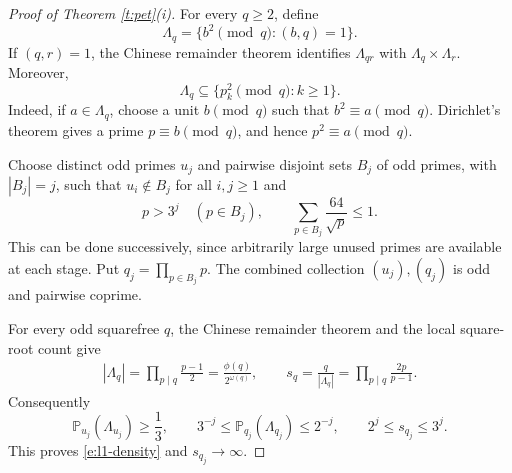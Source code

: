 \documentclass[12pt,reqno]{amsart}
\numberwithin{equation}{section}
\theoremstyle{definition}
\theoremstyle{remark}
\begin{document}
\begin{proof}[Proof of Theorem \ref{t:pet}\textup{(i)}]
For every \(q\geq2\), define
\[
 \Lambda_q=\{b^2\pmod q:(b,q)=1\}.
\]
If \((q,r)=1\), the Chinese remainder theorem identifies
\(\Lambda_{qr}\) with \(\Lambda_q\times\Lambda_r\).  Moreover,
\[
 \Lambda_q\subseteq\{p_k^2\pmod q:k\geq1\}.
\]
Indeed, if \(a\in\Lambda_q\), choose a unit \(b\pmod q\) such that
\(b^2\equiv a\pmod q\).  Dirichlet's theorem gives a prime
\(p\equiv b\pmod q\), and hence \(p^2\equiv a\pmod q\).



Choose distinct odd primes \(u_j\) and pairwise disjoint sets
\(B_j\) of odd primes, with \(|B_j|=j\), such that
\(u_i\notin B_j\) for all \(i,j\geq1\) and
\[
 p>3^j\quad(p\in B_j),\qquad
 \sum_{p\in B_j}\frac{64}{\sqrt p}\leq1.
\]
This can be done successively, since arbitrarily large unused
primes are available at each stage. Put $q_j=\prod_{p\in B_j}p$. The combined collection
$(u_j),(q_j)$ is odd and pairwise coprime.

For every odd squarefree $q$, the Chinese remainder theorem and the
local square-root count give
\begin{align}
 |\Lambda_q|=\prod_{p\mid q}\frac{p-1}{2}
   =\frac{\phi(q)}{2^{\omega(q)}},
 \qquad
 s_q=\frac{q}{|\Lambda_q|}
   =\prod_{p\mid q}\frac{2p}{p-1}.                \label{e:l1-size}
\end{align}
Consequently
\[
 \mathbb P_{u_j}(\Lambda_{u_j})\geq\frac13,
 \qquad
 3^{-j}\leq\mathbb P_{q_j}(\Lambda_{q_j})\leq2^{-j},
 \qquad
 2^j\leq s_{q_j}\leq3^j.
\]
This proves \eqref{e:l1-density} and $s_{q_j}\to\infty$.


\end{proof}
\end{document}
